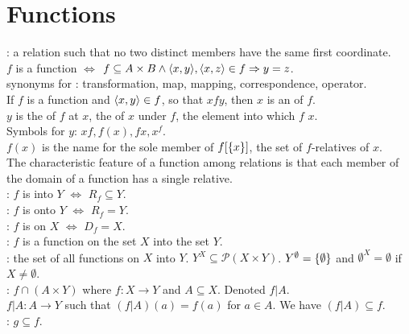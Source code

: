 \documentclass[12pt]{book}
\begin{document}
\section{Functions}

: a relation such that no two distinct members have the same first coordinate.\\$f$ is a function $\iff$ $f\subseteq A\times B \land \langle x,y\rangle,\langle x,z\rangle\in f \Rightarrow y=z$.\\

synonyms for : transformation, map, mapping, correspondence, operator.\\

If $f$ is a function and $\langle x,y\rangle\in f$, so that $xfy$, then $x$ is an  of $f$.\\$y$ is the  of $f$ at $x$, the  of $x$ under $f$, the element into which $f$  $x$.\\Symbols for $y$: $xf, f(x), fx, x^f$.\\$f(x)$ is the name for the sole member of $f[\{x\}]$, the set of $f$-relatives of $x$.\\The characteristic feature of a function among relations is that each member of the domain of a function has a single relative.\\

: $f$ is into $Y$ $\iff$ $R_f \subseteq Y$.\\

: $f$ is onto $Y$ $\iff$ $R_f = Y$.\\

: $f$ is on $X$ $\iff$ $D_f = X$.\\

: $f$ is a function on the set $X$ into the set $Y$.\\

: the set of all functions on $X$ into $Y$. $Y^X \subseteq \mathcal{P}(X\times Y)$. $Y^\emptyset = \{\emptyset\}$ and $\emptyset^X = \emptyset$ if $X\neq\emptyset$.\\

: $f\cap(A\times Y)$ where $f:X\rightarrow Y$ and $A\subseteq X$. Denoted $f|A$.\\$f|A:A\rightarrow Y$ such that $(f|A)(a) = f(a)$ for $a\in A$. We have $(f|A)\subseteq f$.\\

 : $g\subseteq f$.\\
\end{document}
